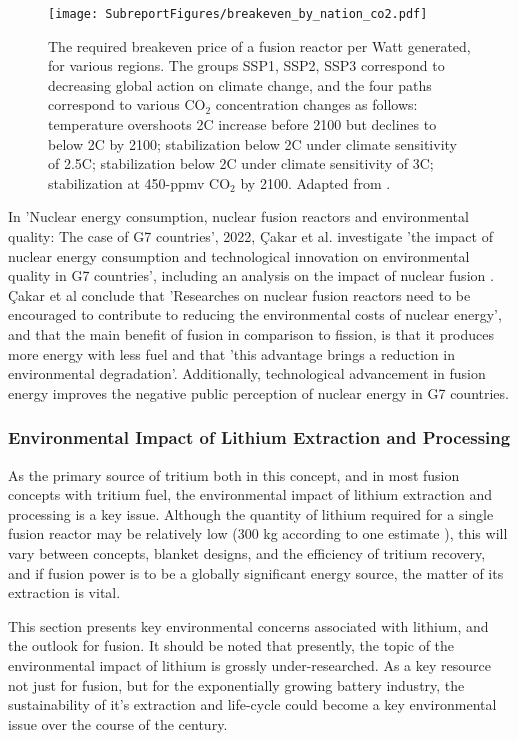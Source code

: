 \begin{figure}[h!]
    \centering
    \texttt{[image: SubreportFigures/breakeven\_by\_nation\_co2.pdf]}
    \caption{ The required breakeven price of a fusion reactor per Watt generated, for various regions. The groups SSP1, SSP2, SSP3 correspond to decreasing global action on climate change, and the four paths correspond to various CO$_2$ concentration changes as follows: temperature overshoots 2\degree C increase before 2100 but declines to below 2\degree C by 2100; stabilization below 2\degree C under climate sensitivity of 2.5\degree C;  stabilization below 2\degree C under climate sensitivity of 3\degree C; stabilization at 450-ppmv CO$_2$ by 2100. Adapted from \cite{gi2020potential}. }
    \label{fig:breakeven}
\end{figure}

In 'Nuclear energy consumption, nuclear fusion reactors and environmental quality: The case of G7 countries', 2022, Çakar et al. investigate 'the impact of nuclear energy consumption and technological innovation on environmental quality in G7 countries', including an analysis on the impact of nuclear fusion \cite{ccakar2022nuclear}. Çakar et al conclude that 'Researches on nuclear fusion reactors need to be encouraged to contribute to reducing the environmental costs of nuclear
energy', and that the main benefit of fusion in comparison to fission, is that it produces more energy with less fuel and that 'this advantage brings a reduction in environmental degradation'. Additionally, technological advancement in fusion energy improves the negative public perception of nuclear energy in G7 countries.

\subsubsection{Environmental Impact of Lithium Extraction and Processing}

As the primary source of tritium both in this concept, and in most fusion concepts with tritium fuel, the environmental impact of lithium extraction and processing is a key issue. Although the quantity of lithium required for a single fusion reactor may be relatively low (300 kg according to one estimate \cite{rytov1992environmental}), this will vary between concepts, blanket designs, and the efficiency of tritium recovery, and if fusion power is to be a globally significant energy source, the matter of its extraction is vital. 

This section presents key environmental concerns associated with lithium, and the outlook for fusion. It should be noted that presently, the topic of the environmental impact of lithium is grossly under-researched. As a key resource not just for fusion, but for the exponentially growing battery industry, the sustainability of it's extraction and life-cycle could become a key environmental issue over the course of the century. 

